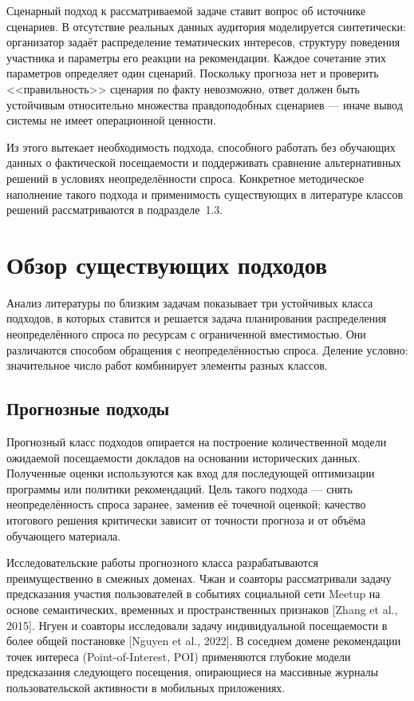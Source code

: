 Сценарный подход к рассматриваемой задаче ставит вопрос об источнике сценариев. В отсутствие реальных данных аудитория моделируется синтетически: организатор задаёт распределение тематических интересов, структуру поведения участника и параметры его реакции на рекомендации. Каждое сочетание этих параметров определяет один сценарий. Поскольку прогноза нет и проверить <<правильность>> сценария по факту невозможно, ответ должен быть устойчивым относительно множества правдоподобных сценариев --- иначе вывод системы не имеет операционной ценности.

Из этого вытекает необходимость подхода, способного работать без обучающих данных о фактической посещаемости и поддерживать сравнение альтернативных решений в условиях неопределённости спроса. Конкретное методическое наполнение такого подхода и применимость существующих в литературе классов решений рассматриваются в подразделе~1.3.


\section{Обзор существующих подходов}

Анализ литературы по близким задачам показывает три устойчивых класса подходов, в которых ставится и решается задача планирования распределения неопределённого спроса по ресурсам с ограниченной вместимостью. Они различаются способом обращения с неопределённостью спроса. Деление условно: значительное число работ комбинирует элементы разных классов.


\subsection{Прогнозные подходы}

Прогнозный класс подходов опирается на построение количественной модели ожидаемой посещаемости докладов на основании исторических данных. Полученные оценки используются как вход для последующей оптимизации программы или политики рекомендаций. Цель такого подхода --- снять неопределённость спроса заранее, заменив её точечной оценкой; качество итогового решения критически зависит от точности прогноза и от объёма обучающего материала.

Исследовательские работы прогнозного класса разрабатываются преимущественно в смежных доменах. Чжан и соавторы рассматривали задачу предсказания участия пользователей в событиях социальной сети Meetup на основе семантических, временных и пространственных признаков [Zhang et al., 2015]. Нгуен и соавторы исследовали задачу индивидуальной посещаемости в более общей постановке [Nguyen et al., 2022]. В соседнем домене рекомендации точек интереса (Point-of-Interest, POI) применяются глубокие модели предсказания следующего посещения, опирающиеся на массивные журналы пользовательской активности в мобильных приложениях.

